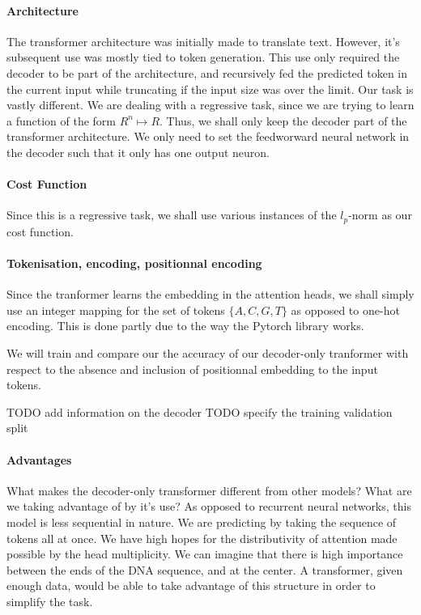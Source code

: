 \documentclass{article}
\begin{document}
\paragraph{Architecture}
The transformer architecture was initially made to translate text.
However, it's subsequent use was mostly tied to token generation. 
This use only required the decoder to be part of the architecture, 
and recursively fed the predicted token in the current input while 
truncating if the input size was over the limit.
Our task is vastly different. We are dealing with a regressive task,
since we are trying to learn a function of the form $R^n \mapsto R$.
Thus, we shall only keep the decoder part of the transformer architecture. 
We only need to set the feedworward neural network in the decoder such that 
it only has one output neuron.
\paragraph{Cost Function}
Since this is a regressive task, we shall use various instances of the 
$l_p$-norm as our cost function.

\paragraph{Tokenisation, encoding, positionnal encoding}
Since the tranformer learns the embedding in the attention heads, \cite{transformers} we
shall simply use an integer mapping for the set of tokens $\{A,C,G,T\}$ as opposed to 
one-hot encoding. This is done partly due to the way the Pytorch library works.

We will train and compare our the accuracy of our decoder-only tranformer with 
respect to the absence and inclusion of positionnal embedding to the input tokens.

TODO add information on the decoder
TODO specify the training validation split

\paragraph{Advantages}
What makes the decoder-only transformer different from other models? What are
we taking advantage of by it's use? As opposed to recurrent neural networks, 
this model is less sequential in nature. We are predicting by 
taking the sequence of tokens all at once. We have high hopes for the 
distributivity of attention made possible by the head multiplicity.
We can imagine that there is high importance between the ends of the DNA 
sequence, and at the center. A transformer, given enough data, would 
be able to take advantage of this structure in order to simplify the task.
\end{document}
